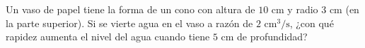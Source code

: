 \item Un vaso de papel tiene la forma de un cono con altura de $10 \text{ cm}$ y radio $3 \text{ cm}$ (en la parte superior). Si se vierte agua en el vaso a razón de $2 \text{ cm}^3/\text{s}$, ¿con qué rapidez aumenta el nivel del agua cuando tiene $5 \text{ cm}$ de profundidad?
